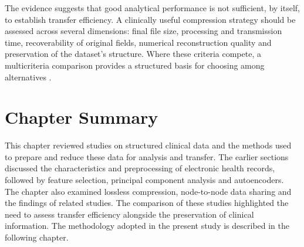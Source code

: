 \noindent The evidence suggests that good analytical performance is not
sufficient, by itself, to establish transfer efficiency. A clinically
useful compression strategy should be assessed across several
dimensions: final file size, processing and transmission time,
recoverability of original fields, numerical reconstruction quality and
preservation of the dataset's structure. Where these criteria compete, a
multicriteria comparison provides a structured basis for choosing among
alternatives \citep{Behzadian2012}.

\section{Chapter Summary}\label{sec:literature-summary}

This chapter reviewed studies on structured clinical data and the methods used to prepare and reduce these data for analysis and transfer. The earlier sections discussed the characteristics and preprocessing of electronic health records, followed by feature selection, principal component analysis and autoencoders. The chapter also examined lossless compression, node-to-node data sharing and the findings of related studies. The comparison of these studies highlighted the need to assess transfer efficiency alongside the preservation of clinical information. The methodology adopted in the present study is described in the following chapter.

